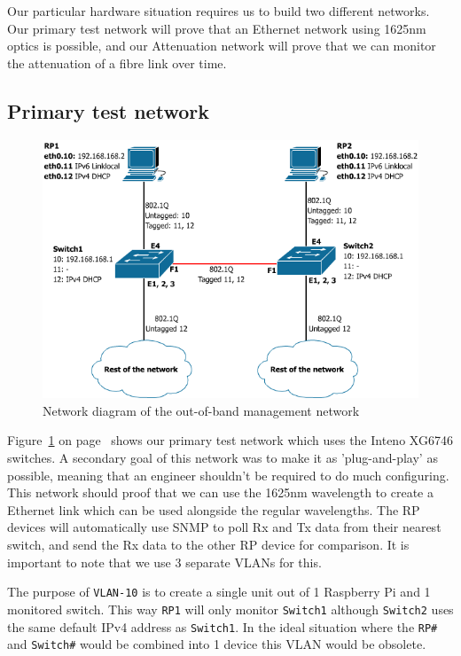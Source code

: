 \documentclass{article}
\begin{document}
Our particular hardware situation requires us to build two different networks. Our primary test network will prove that an Ethernet network using 1625nm optics is possible, and our Attenuation network will prove that we can monitor the attenuation of a fibre link over time.

\subsection{Primary test network}
\begin{figure}[h]
\centerline{\includegraphics[scale=0.4]{images/PoC_all.png}}
\caption{Network diagram of the out-of-band management network}
\label{fig:poc_all}
\end{figure}

Figure~\ref{fig:poc_all} on page~\pageref{fig:poc_all} shows our primary test network which uses the Inteno XG6746 switches. A secondary goal of this network was to make it as 'plug-and-play' as possible, meaning that an engineer shouldn't be required to do much configuring. This network should proof that we can use the 1625nm wavelength to create a Ethernet link which can be used alongside the regular wavelengths. The RP devices will automatically use SNMP to poll Rx and Tx data from their nearest switch, and send the Rx data to the other RP device for comparison. It is important to note that we use 3 separate VLANs for this. 

The purpose of \texttt{VLAN-10} is to create a single unit out of 1 Raspberry Pi and 1 monitored switch. This way \texttt{RP1} will only monitor \texttt{Switch1} although \texttt{Switch2} uses the same default IPv4 address as \texttt{Switch1}. In the ideal situation where the \texttt{RP\#} and \texttt{Switch\#} would be combined into 1 device this VLAN would be obsolete.
\end{document}
